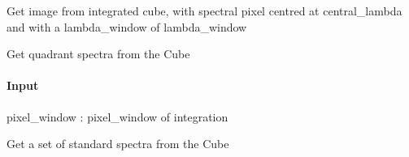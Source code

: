 \documentclass[letterpaper,10pt,english]{sphinxmanual}
\begin{document}
\begin{fulllineitems}
\begin{fulllineitems}
\end{fulllineitems}


\begin{fulllineitems}
\label{\detokenize{api/pymusepipe:pymusepipe.mpdaf_pipe.MuseCube.get_image_from_cube}}
\pysigstartsignatures
{}
\pysigstopsignatures
\sphinxAtStartPar
Get image from integrated cube, with spectral pixel
centred at central\_lambda and with a lambda\_window of lambda\_window

\end{fulllineitems}


\begin{fulllineitems}
\label{\detokenize{api/pymusepipe:pymusepipe.mpdaf_pipe.MuseCube.get_quadrant_spectra_from_cube}}
\pysigstartsignatures
{}
\pysigstopsignatures
\sphinxAtStartPar
Get quadrant spectra from the Cube


\paragraph{Input}
\label{\detokenize{api/pymusepipe:id91}}
\sphinxAtStartPar
pixel\_window : pixel\_window of integration

\end{fulllineitems}


\begin{fulllineitems}
\label{\detokenize{api/pymusepipe:pymusepipe.mpdaf_pipe.MuseCube.get_set_spectra}}
\pysigstartsignatures
{}
\pysigstopsignatures
\sphinxAtStartPar
Get a set of standard spectra from the Cube


\end{fulllineitems}
\end{fulllineitems}
\end{document}
